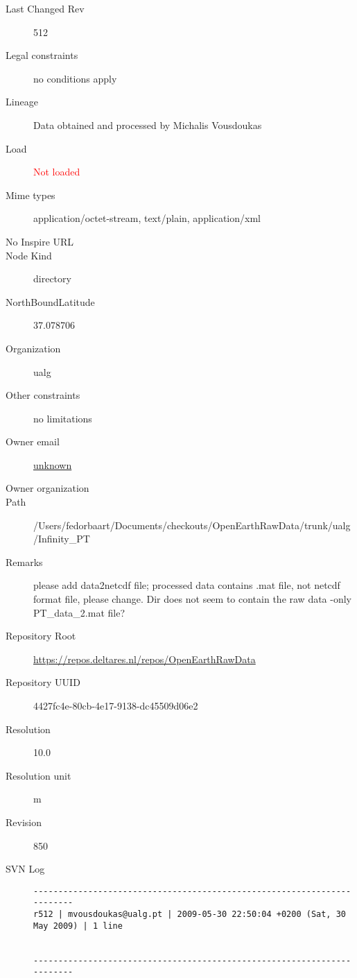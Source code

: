 \documentclass[9]{report}
\begin{document}
\begin{description}
  \item[Last Changed Rev] 512
  \item[Legal constraints] no conditions apply
  \item[Lineage] Data obtained and processed by Michalis Vousdoukas
  \item[Load] \textcolor{red}{Not loaded}
  \item[Mime types] application/octet-stream, text/plain, application/xml
  \item[No Inspire URL] 
  \item[Node Kind] directory
  \item[NorthBoundLatitude] 37.078706
  \item[Organization] ualg
  \item[Other constraints] no limitations
  \item[Owner email] \href{mailto:unknown}{unknown}
  \item[Owner organization] 
  \item[Path] /Users/fedorbaart/Documents/checkouts/OpenEarthRawData/trunk/ualg/Infinity\_PT
  \item[Remarks] please add data2netcdf file; processed data contains .mat file, not netcdf format file, please change. Dir does not seem to contain the raw data -only PT\_data\_2.mat file?
  \item[Repository Root] \href{https://repos.deltares.nl/repos/OpenEarthRawData}{https://repos.deltares.nl/repos/OpenEarthRawData}
  \item[Repository UUID] 4427fc4e-80cb-4e17-9138-dc45509d06e2
  \item[Resolution] 10.0
  \item[Resolution unit] m
  \item[Revision] 850
  \item[SVN Log] \begin{verbatim}
------------------------------------------------------------------------
r512 | mvousdoukas@ualg.pt | 2009-05-30 22:50:04 +0200 (Sat, 30 May 2009) | 1 line


------------------------------------------------------------------------


\end{verbatim}
\end{description}
\end{document}
